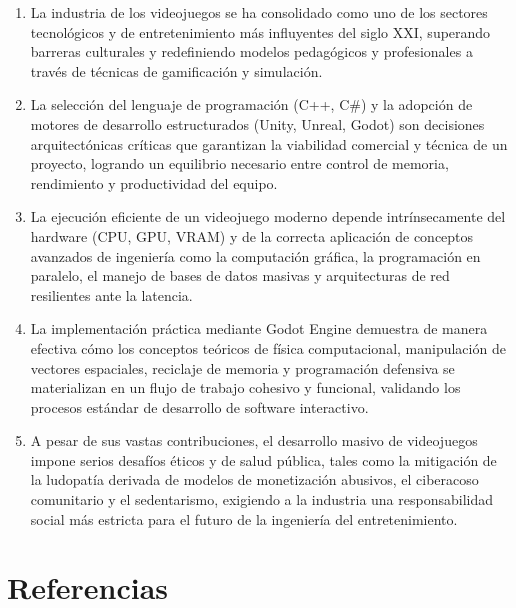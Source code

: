 \documentclass[12pt]{report}
\begin{document}
\begin{enumerate}[label=\arabic*.]
\item La industria de los videojuegos se ha consolidado como uno de los sectores tecnológicos y de entretenimiento más influyentes del siglo XXI, superando barreras culturales y redefiniendo modelos pedagógicos y profesionales a través de técnicas de gamificación y simulación.
\item La selección del lenguaje de programación (C++, C\#) y la adopción de motores de desarrollo estructurados (Unity, Unreal, Godot) son decisiones arquitectónicas críticas que garantizan la viabilidad comercial y técnica de un proyecto, logrando un equilibrio necesario entre control de memoria, rendimiento y productividad del equipo.
\item La ejecución eficiente de un videojuego moderno depende intrínsecamente del hardware (CPU, GPU, VRAM) y de la correcta aplicación de conceptos avanzados de ingeniería como la computación gráfica, la programación en paralelo, el manejo de bases de datos masivas y arquitecturas de red resilientes ante la latencia.
\item La implementación práctica mediante Godot Engine demuestra de manera efectiva cómo los conceptos teóricos de física computacional, manipulación de vectores espaciales, reciclaje de memoria y programación defensiva se materializan en un flujo de trabajo cohesivo y funcional, validando los procesos estándar de desarrollo de software interactivo.
\item A pesar de sus vastas contribuciones, el desarrollo masivo de videojuegos impone serios desafíos éticos y de salud pública, tales como la mitigación de la ludopatía derivada de modelos de monetización abusivos, el ciberacoso comunitario y el sedentarismo, exigiendo a la industria una responsabilidad social más estricta para el futuro de la ingeniería del entretenimiento.
\end{enumerate}

\chapter*{Referencias}
\end{document}
